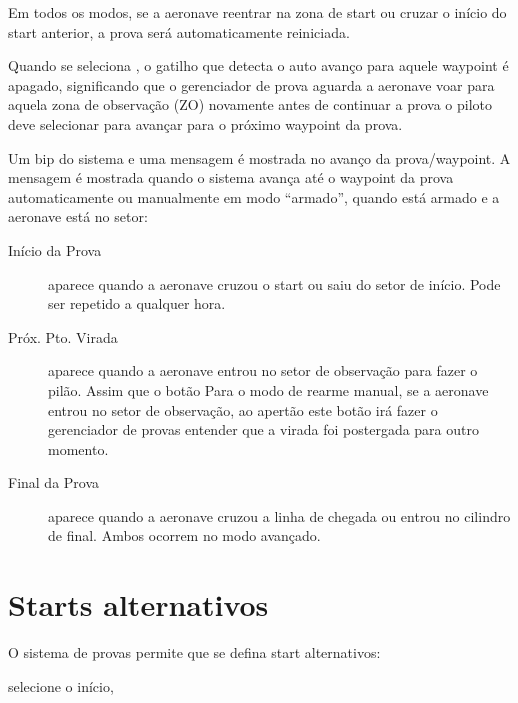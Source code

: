 Em todos os modos, se a aeronave reentrar na zona de start ou cruzar o início do start anterior, a prova será automaticamente reiniciada.

Quando se seleciona  , o gatilho que detecta o auto avanço para aquele waypoint é apagado, significando que o gerenciador de prova aguarda a aeronave voar para aquela zona de observação (ZO) novamente antes de continuar a prova o piloto deve selecionar  para avançar para o próximo waypoint da prova.

Um bip do sistema e uma mensagem é mostrada no avanço da prova/waypoint.  A mensagem é mostrada quando o sistema avança até o waypoint da prova automaticamente ou manualmente em modo “armado”, quando está armado e a aeronave está no setor:
\begin{description}
\item[Início da Prova]  aparece quando a aeronave cruzou o start ou saiu do setor de início.  Pode ser repetido a qualquer hora.
\item[Próx. Pto. Virada]  aparece quando a aeronave entrou no setor de observação para fazer o pilão.  Assim que o botão 
  Para o modo de rearme manual, se a aeronave entrou no setor de observação, ao apertão este botão irá fazer o gerenciador de provas entender que a virada foi postergada para outro momento.
\item[Final da Prova]  aparece quando a aeronave cruzou a linha de chegada ou entrou no cilindro de final.  Ambos ocorrem no modo avançado. 
\end{description}


\section{Starts alternativos}\label{sec:alternate-starts}



O sistema de provas permite que se defina start alternativos:

\blink{} selecione o início, \blink{}

